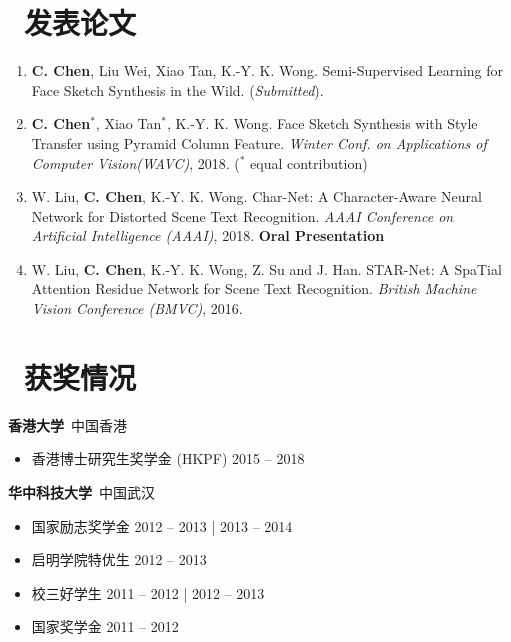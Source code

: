 \documentclass{resume}
\makeatletter
\newlength{\bibhang}
\newlength{\bibsep}
 {\@listi \global\bibsep\itemsep \global\advance\bibsep by\parsep}
\newenvironment{bibsection}%
        {\begin{enumerate}{}{%
       \setlength{\leftmargin}{\bibhang}%
       \setlength{\itemindent}{-\leftmargin}%
       \setlength{\itemsep}{\bibsep}%
       \setlength{\parsep}{\z@}%
        \setlength{\partopsep}{0pt}%
        \setlength{\topsep}{0pt}}}
        {\end{enumerate}\vspace{-.6\baselineskip}}
\makeatother
\begin{document}
\section{\faFileTextO\ 发表论文}

\begin{bibsection}
    \item \textbf{C. Chen}, Liu Wei, Xiao Tan, K.-Y. K. Wong. Semi-Supervised Learning for Face Sketch Synthesis in the Wild. (\emph{Submitted}).
    \item \textbf{C. Chen}$^*$, Xiao Tan$^*$, K.-Y. K. Wong. Face Sketch Synthesis with Style Transfer using Pyramid Column Feature. \emph{Winter Conf. on Applications of Computer Vision(WAVC)}, 2018. ($^*$ equal contribution)  
    \item W. Liu, \textbf{C. Chen}, K.-Y. K. Wong. Char-Net: A Character-Aware Neural Network for Distorted Scene Text Recognition. \emph{AAAI Conference on Artificial Intelligence (AAAI)}, 2018. \textbf{Oral Presentation}
    \item W. Liu, \textbf{C. Chen}, K.-Y. K. Wong, Z. Su and J. Han. STAR-Net: A SpaTial Attention Residue Network for Scene Text Recognition. \emph{British Machine Vision Conference (BMVC)}, 2016.
\end{bibsection}
\vspace{.1in}

\section{\faTrophy\ 获奖情况}
\textbf{香港大学}~中国香港
\begin{itemize}
  \item 香港博士研究生奖学金 (HKPF) \hfill 2015 -- 2018
\end{itemize}

\vspace*{.1in}
\textbf{华中科技大学}~中国武汉
\begin{itemize}
  \item[\textbullet] 国家励志奖学金 \hfill 2012 -- 2013 | 2013 -- 2014
  \item[\textbullet] 启明学院特优生 \hfill 2012 -- 2013
  \item[\textbullet] 校三好学生 \hfill 2011 -- 2012 | 2012 -- 2013
  \item[\textbullet] 国家奖学金 \hfill 2011 -- 2012
\end{itemize}
\end{document}
